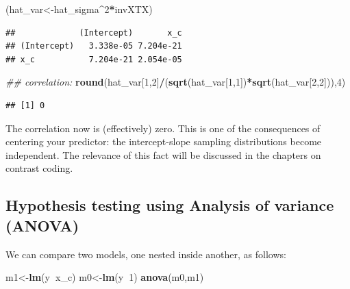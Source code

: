 \documentclass[12pt,]{krantz}
\newenvironment{Shaded}{\begin{snugshade}}{\end{snugshade}}
\newcommand{\CommentTok}[1]{\textcolor[rgb]{0.56,0.35,0.01}{\textit{#1}}}
\newcommand{\DecValTok}[1]{\textcolor[rgb]{0.00,0.00,0.81}{#1}}
\newcommand{\KeywordTok}[1]{\textcolor[rgb]{0.13,0.29,0.53}{\textbf{#1}}}
\newcommand{\NormalTok}[1]{#1}
\newcommand{\OperatorTok}[1]{\textcolor[rgb]{0.81,0.36,0.00}{\textbf{#1}}}
\begin{document}
\begin{Shaded}
\begin{Highlighting}[]
\NormalTok{(hat_var<-hat_sigma}\OperatorTok{^}\DecValTok{2}\OperatorTok{*}\NormalTok{invXTX)}
\end{Highlighting}
\end{Shaded}

\begin{verbatim}
##             (Intercept)       x_c
## (Intercept)   3.338e-05 7.204e-21
## x_c           7.204e-21 2.054e-05
\end{verbatim}

\begin{Shaded}
\begin{Highlighting}[]
\CommentTok{## correlation:}
\KeywordTok{round}\NormalTok{(hat_var[}\DecValTok{1}\NormalTok{,}\DecValTok{2}\NormalTok{]}\OperatorTok{/}\NormalTok{(}\KeywordTok{sqrt}\NormalTok{(hat_var[}\DecValTok{1}\NormalTok{,}\DecValTok{1}\NormalTok{])}\OperatorTok{*}\KeywordTok{sqrt}\NormalTok{(hat_var[}\DecValTok{2}\NormalTok{,}\DecValTok{2}\NormalTok{])),}\DecValTok{4}\NormalTok{)}
\end{Highlighting}
\end{Shaded}

\begin{verbatim}
## [1] 0
\end{verbatim}

The correlation now is (effectively) zero. This is one of the consequences of centering your predictor: the intercept-slope sampling distributions become independent. The relevance of this fact will be discussed in the chapters on contrast coding.

\hypertarget{hypothesis-testing-using-analysis-of-variance-anova}{%
\subsection{Hypothesis testing using Analysis of variance (ANOVA)}\label{hypothesis-testing-using-analysis-of-variance-anova}}

We can compare two models, one nested inside another, as follows:

\begin{Shaded}
\begin{Highlighting}[]
\NormalTok{m1<-}\KeywordTok{lm}\NormalTok{(y}\OperatorTok{~}\NormalTok{x_c)}
\NormalTok{m0<-}\KeywordTok{lm}\NormalTok{(y}\OperatorTok{~}\DecValTok{1}\NormalTok{)}
\KeywordTok{anova}\NormalTok{(m0,m1)}
\end{Highlighting}
\end{Shaded}
\end{document}
